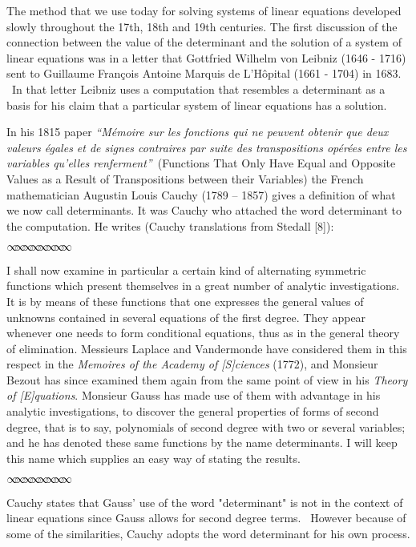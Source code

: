 \documentclass[11pt]{article}%
\theoremstyle{definition}
\newcommand{\sep}{\vspace{-3pt} \begin{center}
{\mathversion{normal}
$\infty \mspace{-5.5mu} \infty \mspace{-5.5mu}
\infty \mspace{-5.5mu} \infty \mspace{-5.5mu}
\infty \mspace{-5.5mu} \infty \mspace{-5.5mu}
\infty \mspace{-5.5mu} \infty$}
\end{center} \vspace{-3pt}}
\begin{document}
The method that we use today for solving systems of linear equations developed
slowly throughout the 17th, 18th and 19th centuries. The first discussion of
the connection between the value of the determinant and the solution of a
system of linear equations was in a letter that Gottfried Wilhelm von Leibniz
(1646 - 1716) sent to Guillaume Fran\c{c}ois Antoine Marquis de L'H\^{o}pital
(1661 - 1704) in 1683. \ In that letter Leibniz uses a computation that
resembles a determinant as a basis for his claim that a particular system of
linear equations has a solution.\textit{ }

In his 1815 paper \textit{\textquotedblleft M\'{e}moire sur les fonctions qui
ne peuvent obtenir que deux valeurs \'{e}gales et de signes contraires par
suite des transpositions op\'{e}r\'{e}es entre les variables qu'elles
renferment\textquotedblright}\ (Functions That Only Have Equal and Opposite
Values as a Result of Transpositions between their Variables) the French
mathematician Augustin Louis Cauchy (1789 -- 1857) gives a definition of what
we now call determinants. It was Cauchy who attached the word determinant to
the computation. He writes (Cauchy translations from Stedall [8]):%

\sep


\textsf{I shall now examine in particular a certain kind of alternating
symmetric functions which present themselves in a great number of analytic
investigations. It is by means of these functions that one expresses the
general values of unknowns contained in several equations of the first degree.
They appear whenever one needs to form conditional equations, thus as in the
general theory of elimination. Messieurs Laplace and Vandermonde have
considered them in this respect in the \textit{Memoires of the Academy of
[S]ciences} (1772), and Monsieur Bezout has since examined them again from the
same point of view in his \textit{Theory of [E]quations}. Monsieur Gauss has
made use of them with advantage in his analytic investigations, to discover
the general properties of forms of second degree, that is to say, polynomials
of second degree with two or several variables; and he has denoted these same
functions by the name determinants. I will keep this name which supplies an
easy way of stating the results.}%

\sep


Cauchy states that Gauss' use of the word "determinant" is not in the context
of linear equations since Gauss allows for second degree terms. \ However
because of some of the similarities, Cauchy adopts the word determinant for
his own process. \ 
\end{document}
